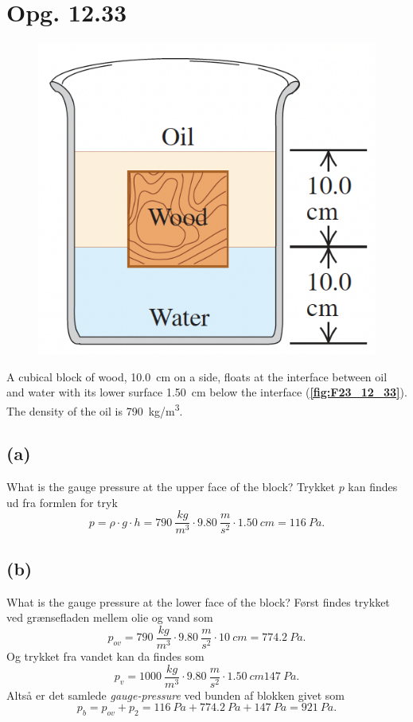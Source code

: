 \documentclass[12pt]{article}
\theoremstyle{definition}
\begin{document}
\section*{Opg. 12.33}
\begin{figure} [ht]
  \centering
  \caption{}
  \includegraphics[width=0.3\linewidth]{../figures/F23_12_33.png}
  \label{fig:F23_12_33}
\end{figure}
A cubical block of wood, \qty{10,0}{cm} on a side, floats at the interface between oil and water with its lower surface \qty{1,50}{cm} below the interface
(\textbf{\autoref{fig:F23_12_33}}). The density of the oil is \qty{790}{kg/m^3}.

\subsection*{(a)}
What is the gauge pressure at the upper face of the block?
\bigbreak
Trykket $p$ kan findes ud fra formlen for tryk
\[ 
p = \rho \cdot g \cdot h = \qty{790}{\frac{kg}{m^3}} \cdot \qty{9,80}{\frac{m}{s^2}} \cdot \qty{1,50}{cm} = \qty{116}{Pa}
.\]

\subsection*{(b)}
What is the gauge pressure at the lower face of the block?
\bigbreak
Først findes trykket ved grænsefladen mellem olie og vand som
\[ 
p_{ov} = \qty{790}{\frac{kg}{m^3}} \cdot \qty{9,80}{\frac{m}{s^2}} \cdot \qty{10}{cm} = \qty{774,2}{Pa} 
.\]
Og trykket fra vandet kan da findes som
\[ 
p_{v} = \qty{1000}{\frac{kg}{m^3}} \cdot \qty{9,80}{\frac{m}{s^2}} \cdot \qty{1,50}{cm} \qty{147}{Pa} 
.\]
Altså er det samlede \textit{gauge-pressure} ved bunden af blokken givet som
\[ 
  p_{b} = p_{ov} + p_2 = \qty{116}{Pa} + \qty{774,2}{Pa} + \qty{147}{Pa} = \qty{921}{Pa}
.\]
\end{document}
